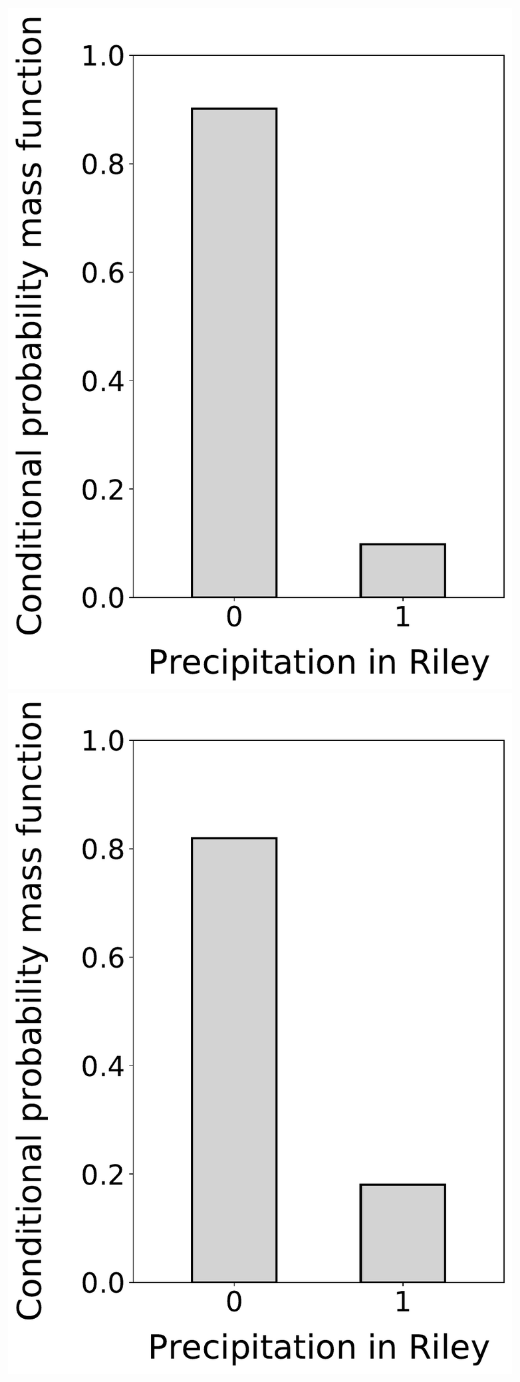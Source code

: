 \documentclass[12pt,twoside]{article}
\begin{document}
\begin{enumerate}
\includegraphics[scale=.5]{precipitation_cond_pmf_3_given_1eq0_2eq1.pdf}
\includegraphics[scale=.5]{precipitation_cond_pmf_3_given_1eq1.pdf}

\end{enumerate}
\end{document}
